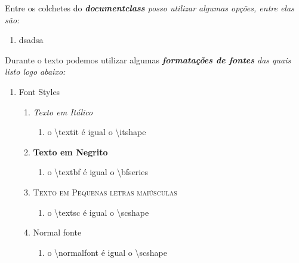 \documentclass[11pt,a4paper]{article}
\begin{document}
	Entre os colchetes do \itshape \textbf{documentclass} \normalfont posso utilizar algumas opções, entre elas são:
	
\begin{enumerate}
	\item dsadsa
\end{enumerate}	
	
\Large Durante o texto podemos utilizar algumas \itshape \textbf {formatações de fontes} \normalfont das quais listo logo abaixo:\\ \normalsize

\begin{enumerate}
	\item Font Styles
		\begin{enumerate}
			\item {\LARGE{\textit{Texto em Itálico}}}
				\begin{enumerate}
					\item o \textbackslash textit é igual o \textbackslash itshape
				\end{enumerate}
			\item {\LARGE\textbf{Texto em Negrito}}
				\begin{enumerate}
					\item o \textbackslash textbf é igual o \textbackslash bfseries
				\end{enumerate}
			\item {\LARGE\textsc{Texto em Pequenas letras maiúsculas}}
				\begin{enumerate}
					\item o \textbackslash textsc é igual o \textbackslash scshape
				\end{enumerate}
			\item {\normalfont\LARGE{Normal fonte}}
			\begin{enumerate}
				\item o \textbackslash normalfont é igual o \textbackslash scshape
			\end{enumerate}	
				

\end{enumerate}
\end{enumerate}
\end{document}
